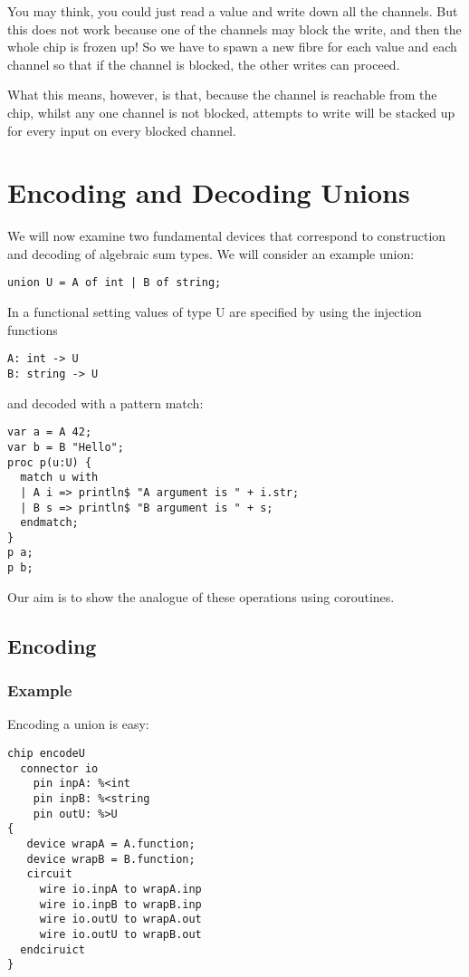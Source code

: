 \documentclass[oneside]{book}
\begin{document}
You may think, you could just read a value and write down all
the channels. But this does not work because one of the channels
may block the write, and then the whole chip is frozen up!
So we have to spawn a new fibre for each value and each channel
so that if the channel is blocked, the other writes can proceed.

What this means, however, is that, because the channel is reachable
from the chip, whilst any one channel is not blocked, attempts to write
will be stacked up for every input on every blocked channel. 

\section{Encoding and Decoding Unions}
We will now examine two fundamental devices that correspond to construction and
decoding of algebraic sum types. We will consider an example union:

\begin{verbatim}
union U = A of int | B of string;
\end{verbatim}

In a functional setting values of type U are specified by using the
injection functions 

\begin{verbatim}
A: int -> U
B: string -> U
\end{verbatim}

and decoded with a pattern match:

\begin{verbatim}
var a = A 42;
var b = B "Hello";
proc p(u:U) {
  match u with
  | A i => println$ "A argument is " + i.str;
  | B s => println$ "B argument is " + s;
  endmatch;
}
p a;
p b;
\end{verbatim}

Our aim is to show the analogue of these operations using coroutines.

\subsection{Encoding}
\subsubsection{Example}
Encoding a union is easy:

\begin{verbatim}
chip encodeU 
  connector io
    pin inpA: %<int
    pin inpB: %<string
    pin outU: %>U
{
   device wrapA = A.function;
   device wrapB = B.function;
   circuit
     wire io.inpA to wrapA.inp
     wire io.inpB to wrapB.inp
     wire io.outU to wrapA.out
     wire io.outU to wrapB.out
  endciruict
}
\end{verbatim}
\end{document}

